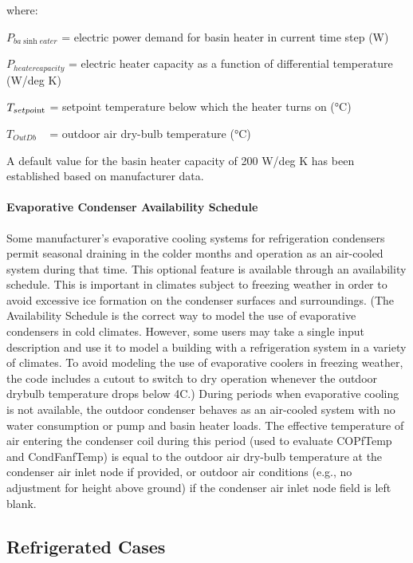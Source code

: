 where:

\({P_{ba\sinh eater}}\) = electric power demand for basin heater in current time step (W)

\({P_{heatercapacity}}\) = electric heater capacity as a function of differential temperature (W/deg K)

\({T_{setpo{\mathop{\rm int}} }}\) = setpoint temperature below which the heater turns on (°C)

\({T_{OutDb}}\) ~ = outdoor air dry-bulb temperature (°C)

A default value for the basin heater capacity of 200 W/deg K has been established based on manufacturer data.

\paragraph{Evaporative Condenser Availability Schedule}\label{evaporative-condenser-availability-schedule}

Some manufacturer's evaporative cooling systems for refrigeration condensers permit seasonal draining in the colder months and operation as an air-cooled system during that time. This optional feature is available through an availability schedule. This is important in climates subject to freezing weather in order to avoid excessive ice formation on the condenser surfaces and surroundings. (The Availability Schedule is the correct way to model the use of evaporative condensers in cold climates. However, some users may take a single input description and use it to model a building with a refrigeration system in a variety of climates. To avoid modeling the use of evaporative coolers in freezing weather, the code includes a cutout to switch to dry operation whenever the outdoor drybulb temperature drops below 4C.) During periods when evaporative cooling is not available, the outdoor condenser behaves as an air-cooled system with no water consumption or pump and basin heater loads. The effective temperature of air entering the condenser coil during this period (used to evaluate COPfTemp and CondFanfTemp) is equal to the outdoor air dry-bulb temperature at the condenser air inlet node if provided, or outdoor air conditions (e.g., no adjustment for height above ground) if the condenser air inlet node field is left blank.

\subsection{Refrigerated Cases}\label{refrigerated-cases}

